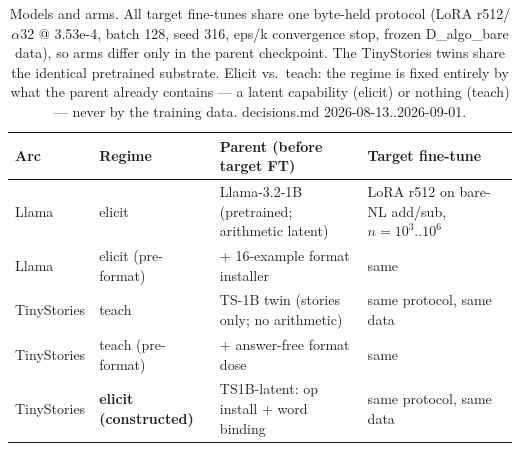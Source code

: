\begin{table}[t]
\centering
\begin{tabular}{llll}
\hline
Arc & Regime & Parent (before target FT) & Target fine-tune \\
\hline
Llama & elicit & Llama-3.2-1B (pretrained; arithmetic latent) & LoRA r512 on bare-NL add/sub, $n=10^3..10^6$ \\
Llama & elicit (pre-format) & + 16-example format installer & same \\
TinyStories & teach & TS-1B twin (stories only; no arithmetic) & same protocol, same data \\
TinyStories & teach (pre-format) & + answer-free format dose & same \\
TinyStories & \textbf{elicit (constructed)} & TS1B-latent: op install + word binding & same protocol, same data \\
\hline
\end{tabular}
\caption{Models and arms. All target fine-tunes share one byte-held protocol (LoRA r512/$\alpha$32 @ 3.53e-4, batch 128, seed 316, eps/k convergence stop, frozen D\_algo\_bare data), so arms differ only in the parent checkpoint. The TinyStories twins share the identical pretrained substrate. Elicit vs.\ teach: the regime is fixed entirely by what the parent already contains --- a latent capability (elicit) or nothing (teach) --- never by the training data. decisions.md 2026-08-13..2026-09-01.}
\label{tab:models_and_arms}
\end{table}
